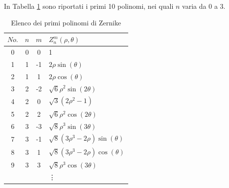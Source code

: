 In Tabella \ref{tab:8zernike} sono riportati i primi 10 polinomi, nei quali $n$ varia da $0$ a 3.
\begin{table}[htb]
\centering
\caption{Elenco dei primi polinomi di Zernike}
\label{tab:8zernike}
\begin{tabular}{cccl}
\toprule
$No.$ & $n$ & $m$ & $Z_n^m(\rho,\theta)$\\
\midrule
0 & 0 &  0  & 1\\
1 & 1 &  -1 & $2\rho\sin(\theta)$\\
2 & 1 &  1  & $2\rho\cos(\theta)$\\
3 & 2 &  -2 & $\sqrt{6}\rho^2\sin(2\theta)$\\
4 & 2 &  0  & $\sqrt{3}\left(2\rho^2-1\right)$\\
5 & 2 &  2  & $\sqrt{6}\rho^2\cos(2\theta)$\\
6 & 3 &  -3 & $\sqrt{8}\rho^3\sin(3\theta)$\\
7 & 3 &  -1 & $\sqrt{8}\left(3\rho^3-2\rho\right)\sin(\theta)$\\
8 & 3 &  1  & $\sqrt{8}\left(3\rho^3-2\rho\right)\cos(\theta)$\\
9 & 3 &  3  & $\sqrt{8}\rho^3\cos(3\theta)$\\
&&&\vdots\\
\bottomrule
\end{tabular}
\end{table}


